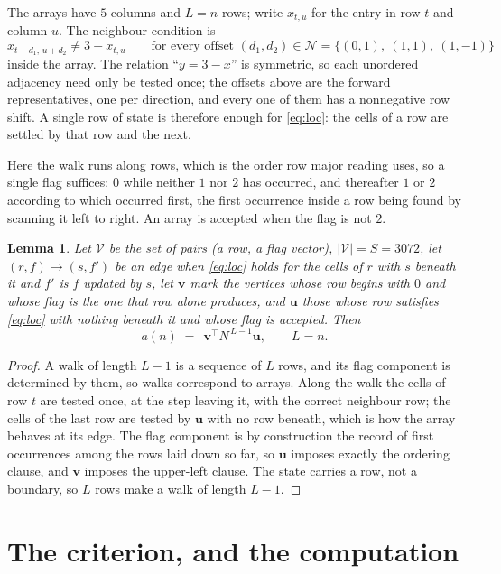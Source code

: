 \documentclass[11pt,a4paper]{article}
\theoremstyle{plain}
\newtheorem{lemma}[theorem]{Lemma}
\theoremstyle{definition}
\begin{document}
The arrays have $5$ columns and $L=n$ rows; write $x_{t,u}$ for the entry in
row $t$ and column $u$. The neighbour condition is
\begin{equation}\label{eq:loc}
x_{t+d_1,\,u+d_2}\ne 3-x_{t,u}\qquad\text{for every offset }(d_1,d_2)\in\mathcal N=\{(0,1),\ (1,1),\ (1,-1)\}
\end{equation}
inside the array. The relation ``$y=3-x$'' is symmetric, so each unordered adjacency need
only be tested once; the offsets above are the forward representatives, one per direction,
and every one of them has a nonnegative row shift. A single row of state is therefore
enough for \eqref{eq:loc}: the cells of a row are settled by that row and the next.

Here the walk runs along rows, which is the order row
major reading uses, so a single flag suffices: $0$ while neither $1$ nor $2$ has
occurred, and thereafter $1$ or $2$ according to which occurred first, the first occurrence
inside a row being found by scanning it left to right. An array is accepted when the flag
is not $2$.

\begin{lemma}\label{lem:walk}
Let $\mathcal V$ be the set of pairs (a row, a flag vector), $|\mathcal V|=S=3072$, let
$(r,f)\to(s,f')$ be an edge when \eqref{eq:loc} holds for the cells of $r$ with $s$ beneath
it and $f'$ is $f$ updated by $s$, let $\mathbf{v}$ mark the vertices whose row begins
with $0$ and whose flag is the one that row alone produces, and $\mathbf{u}$ those whose
row satisfies \eqref{eq:loc} with nothing beneath it and whose flag is accepted. Then
\[
a(n)\;=\;\,\mathbf{v}^{\!\top}N^{\,L-1}\mathbf{u},\qquad L=n.
\]
\end{lemma}

\begin{proof}
A walk of length $L-1$ is a sequence of $L$ rows, and its flag component is determined by
them, so walks correspond to arrays. Along the walk the cells of row $t$ are tested once,
at the step leaving it, with the correct neighbour row; the cells of the last row are
tested by $\mathbf{u}$ with no row beneath, which is how the array behaves at its edge.
The flag component is by construction the record of first occurrences among the rows laid
down so far, so $\mathbf{u}$ imposes exactly the ordering clause, and $\mathbf{v}$ imposes
the upper-left clause. The state carries a row, not a boundary, so $L$ rows make a walk
of length $L-1$.
\end{proof}

\section{The criterion, and the computation}
\end{document}
